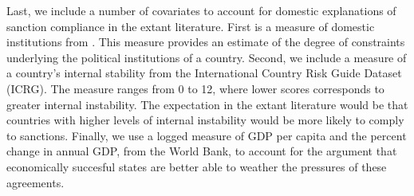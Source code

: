 Last, we include a number of covariates to account for domestic explanations of sanction compliance in the extant literature. First is a measure of domestic institutions from \citet{henisz2000a}. This measure provides an estimate of the degree of constraints underlying the political institutions of a country. Second, we include a measure of a country's internal stability from the International Country Risk Guide Dataset (ICRG). The measure ranges from 0 to 12, where lower scores corresponds to greater internal instability. The expectation in the extant literature would be that countries with higher levels of internal instability would be more likely to comply to sanctions. Finally, we use a logged measure of GDP per capita and the percent change in annual GDP, from the World Bank, to account for the argument that economically succesful states are better able to weather the pressures of these agreements.

